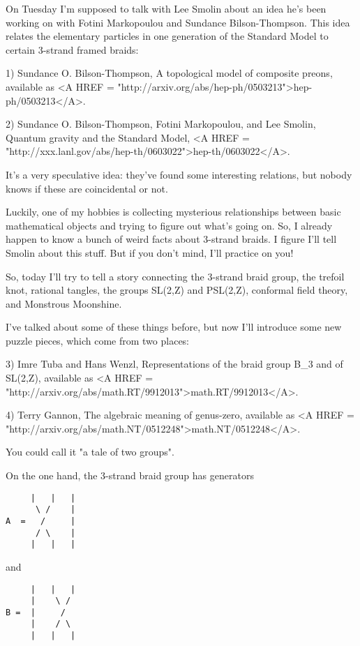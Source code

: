 

On Tuesday I'm supposed to talk with Lee Smolin about an idea he's
been working on with Fotini Markopoulou and Sundance Bilson-Thompson.
This idea relates the elementary particles in one generation of the 
Standard Model to certain 3-strand framed braids:

1) Sundance O. Bilson-Thompson, A topological model of composite
preons, available as <A HREF =
"http://arxiv.org/abs/hep-ph/0503213">hep-ph/0503213</A>.

2) Sundance O. Bilson-Thompson, Fotini Markopoulou, and Lee Smolin, 
Quantum gravity and the Standard Model, <A HREF = "http://xxx.lanl.gov/abs/hep-th/0603022">hep-th/0603022</A>.
 
It's a very speculative idea: they've found some interesting relations, 
but nobody knows if these are coincidental or not.  

Luckily, one of my hobbies is collecting mysterious relationships between
basic mathematical objects and trying to figure out what's going on.
So, I already happen to know a bunch of weird facts about 3-strand braids.  
I figure I'll tell Smolin about this stuff.  But if you don't mind, I'll 
practice on you!  

So, today I'll try to tell a story connecting the 3-strand braid group, 
the trefoil knot, rational tangles, the groups SL(2,Z) and PSL(2,Z), 
conformal field theory, and Monstrous Moonshine.  

I've talked about some of these things before, but now I'll introduce
some new puzzle pieces, which come from two places:

3) Imre Tuba and Hans Wenzl, Representations of the braid group B_{3}
and of SL(2,Z), available as <A HREF =
"http://arxiv.org/abs/math.RT/9912013">math.RT/9912013</A>.
 
4) Terry Gannon, The algebraic meaning of genus-zero, available as
<A HREF = "http://arxiv.org/abs/math.NT/0512248">math.NT/0512248</A>.

You could call it "a tale of two groups".

On the one hand, the 3-strand braid group has generators 

\begin{verbatim}
     |   |   |
      \ /    |
A  =   /     |
      / \    |
     |   |   |
\end{verbatim}
    
and

\begin{verbatim}
     |   |   |   
     |    \ /    
B =  |     /    
     |    / \  
     |   |   |
\end{verbatim}
    
